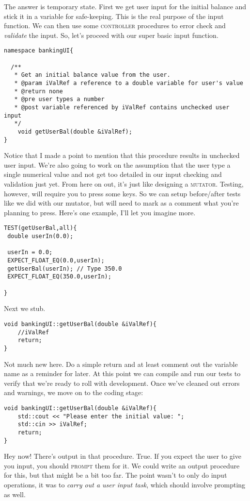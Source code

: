 The answer is temporary state. First we get user input for the initial balance and stick it in a variable for safe-keeping. This is the real purpose of the input function. We can then use some \textsc{controller} procedures to error check and \textit{validate} the input. So, let's proceed with our super basic input function.
\begin{verbatim}
namespace bankingUI{

  /**
   * Get an initial balance value from the user. 
   * @param iValRef a reference to a double variable for user's value
   * @return none
   * @pre user types a number
   * @post variable referenced by iValRef contains unchecked user input
   */
	void getUserBal(double &iValRef);   
}	
\end{verbatim}
Notice that I made a point to mention that this procedure results in unchecked user input. We're also going to work on the assumption that the user type a single numerical value and not get too detailed in our input checking and validation just yet. From here on out, it's just like designing a \textsc{mutator}. Testing, however, will require you to press some keys. So we can setup before/after tests like we did with our mutator, but will need to mark as a comment what you're planning to press. Here's one example, I'll let you imagine more.
\begin{verbatim}
TEST(getUserBal,all){
 double userIn(0.0);
 
 userIn = 0.0;
 EXPECT_FLOAT_EQ(0.0,userIn);
 getUserBal(userIn); // Type 350.0
 EXPECT_FLOAT_EQ(350.0,userIn);

}
\end{verbatim}

Next we stub.
\begin{verbatim}
void bankingUI::getUserBal(double &iValRef){
	//iValRef
	return;
}
\end{verbatim}
Not much new here. Do a simple return and at least comment out the variable name as a reminder for later. At this point we can compile and run our tests to verify that we're ready to roll with development. Once we've cleaned out errors and warnings, we move on to the coding stage:
\begin{verbatim}
void bankingUI::getUserBal(double &iValRef){
	std::cout << "Please enter the initial value: ";
	std::cin >> iValRef;
	return;
}
\end{verbatim}
Hey now! There's output in that procedure. True. If you expect the user to give you input, you should \textsc{prompt} them for it. We could write an output procedure for this, but that might be a bit too far. The point wasn't to only do input operations, it was to \textit{carry out a user input task}, which should involve prompting as well. 

